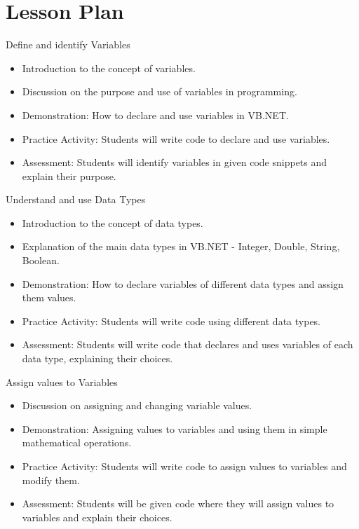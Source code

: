 \documentclass[main.tex]{subfiles}
\begin{document}
\section*{Lesson Plan}

\begin{comment}
  
  \planItem{5}                %
  {Introduction}              %
  {lesson notes and content}  %
  {url}                       %

\end{comment}

{Define and identify Variables}
{ \begin{itemize}
  \item Introduction to the concept of variables.
  \item Discussion on the purpose and use of variables in programming.
  \item Demonstration: How to declare and use variables in VB.NET.
  \item Practice Activity: Students will write code to declare and use variables.
  \item Assessment: Students will identify variables in given code snippets and explain their purpose.
\end{itemize}
}
{}

{Understand and use Data Types}
{ \begin{itemize}
  \item Introduction to the concept of data types.
  \item Explanation of the main data types in VB.NET - Integer, Double, String, Boolean.
  \item Demonstration: How to declare variables of different data types and assign them values.
  \item Practice Activity: Students will write code using different data types.
  \item Assessment: Students will write code that declares and uses variables of each data type, explaining their choices.
\end{itemize}
}
{}

{Assign values to Variables}
{ \begin{itemize}
  \item Discussion on assigning and changing variable values.
  \item Demonstration: Assigning values to variables and using them in simple mathematical operations.
  \item Practice Activity: Students will write code to assign values to variables and modify them.
  \item Assessment: Students will be given code where they will assign values to variables and explain their choices.
\end{itemize}
}
{}
\end{document}
